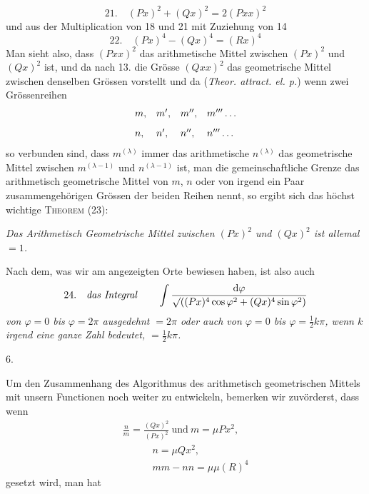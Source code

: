 
\[
21.\quad (Px)^2+(Qx)^2=2(Pxx)^2
\]
und aus der Multiplication von 18 und 21 mit Zuziehung von 14
\[
22.\quad (Px)^4-(Qx)^4=(Rx)^4
\]
Man sieht also, dass $(Pxx)^2$ das arithmetische Mittel zwischen $(Px)^2$ und $(Qx)^2$ ist, und da nach 13. die Grösse $(Qxx)^2$ das geometrische Mittel zwischen denselben Grössen vorstellt und da (\textit{Theor. attract. el. p.}) wenn zwei Grössenreihen
\[
\begin{array}{llll}
m,&m',&m'',&m'''\mathinner{.\,.\,.}\\[8pt]
n,&n',&n'',&n'''\mathinner{.\,.\,.}
\end{array}
\]
so verbunden sind, dass $m^{(\lambda)}$ immer das arithmetische $n^{(\lambda)}$ das geometrische Mittel zwischen $m^{(\lambda-1)}$ und $n^{(\lambda-1)}$ ist, man die gemeinschaftliche Grenze das arithmetisch geometrische Mittel von $m$, $n$ oder von irgend ein Paar zusammengehörigen Grössen der beiden Reihen nennt, so ergibt sich das höchst wichtige \textsc{Theorem} (23):

\textit{Das Arithmetisch Geometrische Mittel zwischen $(Px)^2$ und $(Qx)^2$ ist allemal $=1$.}

Nach dem, was wir am angezeigten Orte bewiesen haben, ist also auch
\[
24.\quad\text{\textit{das Integral}}\qquad
\int\frac{\mathrm{d}\varphi}{\mathord{\surd}{((Px)^4\cos\varphi^2+(Qx)^4\sin\varphi^2)}}
\]
\textit{von $\varphi=0$ bis $\varphi=2\pi$ ausgedehnt $=2\pi$ oder auch von $\varphi=0$ bis $\varphi=\tfrac12k\pi$, wenn $k$ irgend eine ganze Zahl bedeutet, $=\tfrac12k\pi$.}

\par\medskip{}\centerline{6.}\nobreak\smallskip
Um den Zusammenhang des Algorithmus des arithmetisch geometrischen Mittels mit unsern Functionen noch weiter zu entwickeln, bemerken wir zuvörderst, dass wenn
\[
\begin{gathered}\frac{n}{m}=\frac{(Qx)^2}{(Px)^2}\ \text{und}\ m=\mu Px^2,\\[8pt]\quad{}\qquad n=\mu Qx^2,\\[8pt]\quad{}\qquad mm-nn=\mu\mu(R)^4\end{gathered}
\]
gesetzt wird, man hat



